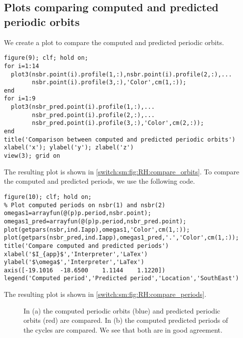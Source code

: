 \subsection{Plots comparing computed and predicted periodic orbits} \label{switch:sm:sec:RH:comparing_period_orbits}
We create a plot to compare the computed and predicted periodic orbits.
\begin{lstlisting}[style=customMatlab]
%% Plot comparing computed and predicted periodic orbits
figure(9); clf; hold on;
for i=1:14
  plot3(nsbr.point(i).profile(1,:),nsbr.point(i).profile(2,:),...
        nsbr.point(i).profile(3,:),'Color',cm(1,:));
end
for i=1:9
  plot3(nsbr_pred.point(i).profile(1,:),...
        nsbr_pred.point(i).profile(2,:),...
        nsbr_pred.point(i).profile(3,:),'Color',cm(2,:));
end
title('Comparison between computed and predicted periodic orbits')
xlabel('x'); ylabel('y'); zlabel('z')
view(3); grid on
\end{lstlisting}
The resulting plot is shown in \cref{switch:sm:fig:RH:compare_orbits}.
To compare the computed and predicted periods, we use the following code.
\begin{lstlisting}[style=customMatlab]
%% Compare computed and predicted periods
figure(10); clf; hold on;
% Plot computed periods on nsbr(1) and nsbr(2)
omegas1=arrayfun(@(p)p.period,nsbr.point);
omegas1_pred=arrayfun(@(p)p.period,nsbr_pred.point);
plot(getpars(nsbr,ind.Iapp),omegas1,'Color',cm(1,:));
plot(getpars(nsbr_pred,ind.Iapp),omegas1_pred,'.','Color',cm(1,:));
title('Compare computed and predicted periods')
xlabel('$I_{app}$','Interpreter','LaTex')
ylabel('$\omega$','Interpreter','LaTex')
axis([-19.1016  -18.6500    1.1144    1.1220])
legend('Computed period','Predicted period','Location','SouthEast')
\end{lstlisting}
The resulting plot is shown in \cref{switch:sm:fig:RH:compare_periods}.

\begin{figure}
\centering
{} \hfill
{}
\caption{In \textup{(a)} the computed periodic orbits (blue) and predicted periodic orbits (red) are compared. In \textup{(b)} the computed predicted periods of the cycles are compared. We see that both are in good agreement.}
\end{figure}

